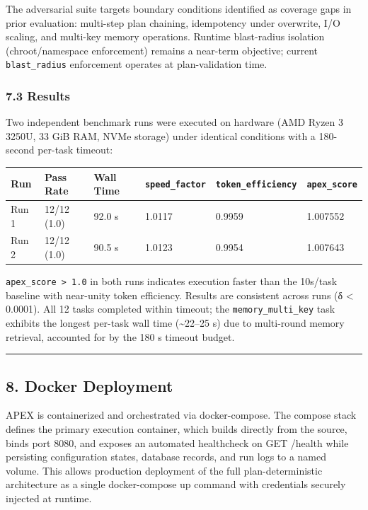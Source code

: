 \documentclass[
]{article}
\begin{document}
The adversarial suite targets boundary conditions identified as coverage
gaps in prior evaluation: multi-step plan chaining, idempotency under
overwrite, I/O scaling, and multi-key memory operations. Runtime
blast-radius isolation (chroot/namespace enforcement) remains a
near-term objective; current \texttt{blast\_radius} enforcement operates
at plan-validation time.

\subsubsection{7.3 Results}\label{73-results}

Two independent benchmark runs were executed on hardware (AMD Ryzen 3
3250U, 33 GiB RAM, NVMe storage) under identical conditions with a
180-second per-task timeout:

\begin{longtable}[]{@{}llllll@{}}
\toprule\noalign{}
Run & Pass Rate & Wall Time & \texttt{speed\_factor} &
\texttt{token\_efficiency} & \texttt{apex\_score} \\
\midrule\noalign{}
\endhead
\bottomrule\noalign{}
\endlastfoot
Run 1 & 12/12 (1.0) & 92.0 s & 1.0117 & 0.9959 & 1.007552 \\
Run 2 & 12/12 (1.0) & 90.5 s & 1.0123 & 0.9954 & 1.007643 \\
\end{longtable}

\texttt{apex\_score\ \textgreater{}\ 1.0} in both runs indicates
execution faster than the 10s/task baseline with near-unity token
efficiency. Results are consistent across runs (δ \textless{} 0.0001).
All 12 tasks completed within timeout; the \texttt{memory\_multi\_key}
task exhibits the longest per-task wall time (\textasciitilde22--25 s)
due to multi-round memory retrieval, accounted for by the 180 s timeout
budget.

\begin{center}\rule{0.5\linewidth}{0.5pt}\end{center}

\subsection{8. Docker Deployment}\label{8-docker-deployment}

APEX is containerized and orchestrated via docker-compose. The compose
stack defines the primary execution container, which builds directly from the
source, binds port 8080, and exposes an automated healthcheck on GET /health
while persisting configuration states, database records, and run logs to a
named volume. This allows production deployment of the full plan-deterministic
architecture as a single docker-compose up command with credentials securely
injected at runtime.
\end{document}
